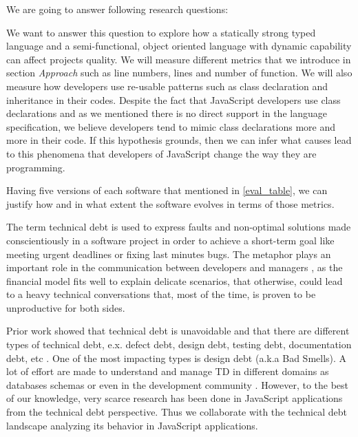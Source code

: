 
We are going to answer following research questions:


\rqi

We want to answer this question to explore how a statically strong typed language and a semi-functional, object oriented language with dynamic capability can affect projects quality. We will measure different metrics that we introduce in section \textit{Approach} such as line numbers, lines and number of function. We will also measure how developers use re-usable patterns such as class declaration and inheritance in their codes. Despite the fact that JavaScript developers use class declarations and as we mentioned there is no direct support in the language specification, we believe developers tend to mimic class declarations more and more in their code. If this hypothesis grounds, then we can infer what causes lead to this phenomena that developers of JavaScript change the way they are programming.
\par
{}
Having five versions of each software that mentioned in \ref{eval_table}, we can justify how and in what extent the software evolves in terms of those metrics. 

\par
\rqii

		 The term technical debt is used to express faults and non-optimal solutions made conscientiously in a software project in order to achieve a short-term goal like meeting urgent deadlines or fixing last minutes bugs. The metaphor plays an important role in the communication between developers and managers \cite{kruchten2013MTD}, as the financial model fits well to explain delicate scenarios, that otherwise, could lead to a heavy technical conversations that, most of the time, is proven to be unproductive for both sides.  
		 
		 \par
		 Prior work showed that technical debt is unavoidable \cite{zazworka2013MTD} and that there are different types of technical debt, e.x. defect debt, design debt, testing debt, documentation debt, etc \cite{Seaman2011MMTD} . One of the most impacting types is design debt \cite{zazworka2011MTD}\cite{Fontana2012MTD} (a.k.a Bad Smells). A lot of effort are made to understand and manage TD in different domains as databases schemas \cite{Weber2014MTD} or even in the development community \cite{Tamburri2013CHASE}. However, to the best of our knowledge, very scarce research has been done in JavaScript applications from the technical debt perspective. Thus we collaborate with the technical debt landscape analyzing its behavior in JavaScript applications. 

